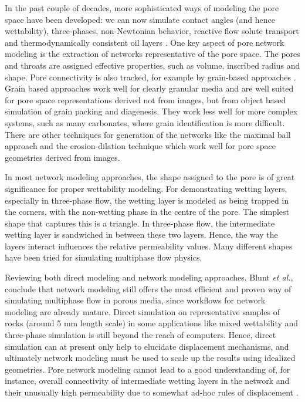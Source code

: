 In the past couple of decades, more sophisticated ways of modeling the pore space have been developed: we can now simulate contact angles (and hence wettability), three-phases, non-Newtonian behavior, reactive flow solute transport and thermodynamically consistent oil layers \cite{van_dijke_existence_2006,oren2003reconstruction,blunt_detailed_2002,piri_three-phase_2004, piri_three-dimensional_2005}. One key aspect of pore network modeling is the extraction of networks representative of the pore space. The pores and throats are assigned effective properties, such as volume, inscribed radius and shape. Pore connectivity is also tracked, for example by grain-based approaches \cite{oren2003reconstruction}. Grain based approaches work well for clearly granular media and are well suited for pore space representations derived not from images, but from object based simulation of grain packing and diagenesis. They work less well for more complex systems, such as many carbonates, where grain identification is more difficult. There are other techniques for generation of the networks like the maximal ball approach \cite{silin2006pore} and the erosion-dilation technique \cite{lindquist2000pore, lindquist1999investigating} which work well for pore space geometries derived from images. 

In most network modeling approaches, the shape assigned to the pore is of great significance for proper wettability modeling. For demonstrating wetting layers, especially in three-phase flow, the wetting layer is modeled as being trapped in the corners, with the non-wetting phase in the centre of the pore. The simplest shape that captures this is a triangle. In three-phase flow, the intermediate wetting layer is sandwiched in between these two layers. Hence, the way the layers interact influences the relative permeability values. Many different shapes have been tried for simulating multiphase flow physics\cite{piri_three-phase_2004}.

Reviewing both direct modeling and network modeling approaches, Blunt \emph{et al.}\cite{blunt_pore-scale_2013}, conclude that network modeling still offers the most efficient and proven way of simulating multiphase flow in porous media, since workflows for network modeling are already mature. Direct simulation on representative samples of rocks (around 5 mm length scale) in some applications like mixed wettability and three-phase simulation is still beyond the reach of computers. Hence, direct simulation can at present only help to elucidate displacement mechanisms, and ultimately network modeling must be used to scale up the results using idealized geometries. Pore network modeling cannot lead to a good understanding of, for instance, overall connectivity of intermediate wetting layers in the network and their unusually high permeability due to somewhat ad-hoc rules of displacement \cite{dicarlo_three-phase_2000, dehghanpour_flow_2011}.


